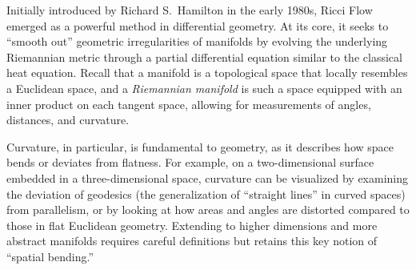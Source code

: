 Initially introduced by Richard S.~Hamilton in the early 1980s, Ricci Flow emerged as a powerful method in differential geometry. At its core, it seeks to ``smooth out'' geometric irregularities of manifolds by evolving the underlying Riemannian metric through a partial differential equation similar to the classical heat equation. Recall that a manifold is a topological space that locally resembles a Euclidean space, and a \emph{Riemannian manifold} is such a space equipped with an inner product on each tangent space, allowing for measurements of angles, distances, and curvature. 

Curvature, in particular, is fundamental to geometry, as it describes how space bends or deviates from flatness. For example, on a two-dimensional surface embedded in a three-dimensional space, curvature can be visualized by examining the deviation of geodesics (the generalization of ``straight lines'' in curved spaces) from parallelism, or by looking at how areas and angles are distorted compared to those in flat Euclidean geometry. Extending to higher dimensions and more abstract manifolds requires careful definitions but retains this key notion of ``spatial bending.'' 

